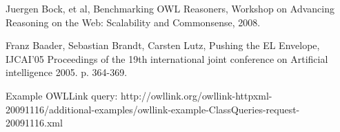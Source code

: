 \documentclass{article}
\begin{document}
\begin{thebibliography}{9}
  Juergen Bock, et al,
  Benchmarking OWL Reasoners,
  Workshop on Advancing Reasoning on the Web: Scalability and Commonsense,
  2008.

  Franz Baader, Sebastian Brandt, Carsten Lutz,
  Pushing the EL Envelope,
  IJCAI'05 Proceedings of the 19th international joint conference on Artificial intelligence
  2005. p. 364-369.

Example OWLLink query:
http://owllink.org/owllink-httpxml-20091116/additional-examples/owllink-example-ClassQueries-request-20091116.xml

\end{thebibliography}
\end{document}
